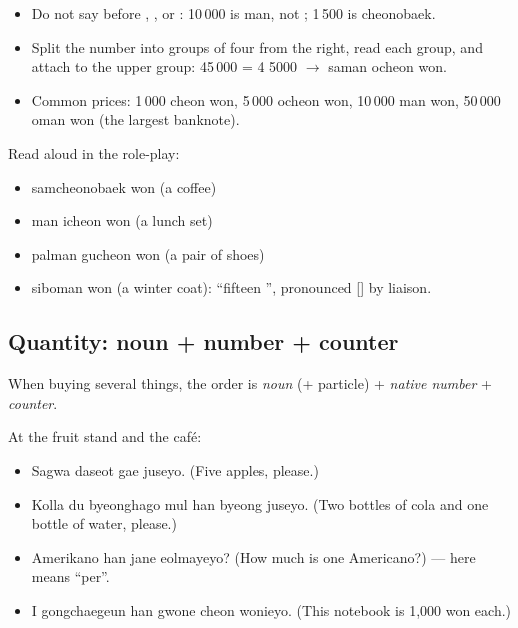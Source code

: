 \begin{important}
\begin{itemize}
  \item Do not say  before , ,  or : 10\,000 is
         man, not ; 1\,500 is  cheonobaek.
  \item Split the number into groups of four from the right, read each group, and attach
         to the upper group: 45\,000 = 4\,{\textbar}\,5000 $\to$ 
        saman ocheon won.
  \item Common prices: 1\,000  cheon won, 5\,000  ocheon won,
        10\,000  man won, 50\,000  oman won (the largest banknote).
\end{itemize}
\end{important}

\begin{example}[Prices]
Read aloud in the role-play:
\begin{itemize}
  \item {}  samcheonobaek won (a coffee)
  \item {}  man icheon won (a lunch set)
  \item {}  palman gucheon won (a pair of shoes)
  \item {}  siboman won (a winter coat): ``fifteen '',
        pronounced [] by liaison.
\end{itemize}
\end{example}

\subsection{Quantity: noun + number + counter}

When buying several things, the order is \emph{noun} (+ particle) + \emph{native number} +
\emph{counter}.

\begin{example}
At the fruit stand and the caf\'e:
\begin{itemize}
  \item {} Sagwa daseot gae juseyo. (Five apples, please.)
  \item {} Kolla du byeonghago mul han byeong juseyo.
        (Two bottles of cola and one bottle of water, please.)
  \item {} Amerikano han jane eolmayeyo? (How much is one
        Americano?) ---  here means ``per''.
  \item {} I gongchaegeun han gwone cheon wonieyo. (This
        notebook is 1,000 won each.)
\end{itemize}
\end{example}

